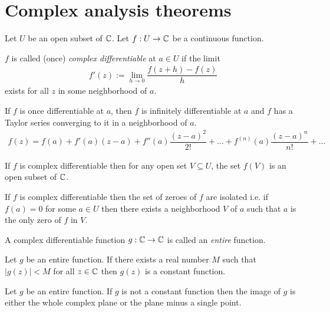 \documentclass{amsart}
\begin{document}
  \section{Complex analysis theorems}
  Let $U$ be an open subset of $\mathbb{C}$.
  Let $f: U \rightarrow \mathbb{C}$ be a continuous function.

  $f$ is called (once) \emph{complex differentiable} at $a \in U$ if the limit
  \begin{align*}
    f'(z) := \lim_{h \rightarrow 0} \dfrac{f(z + h) - f(z)}{h}
  \end{align*}
  exists for all $z$ in some neighborhood of $a$.

  \begin{theorem}
    If $f$ is once differentiable at $a$, then $f$ is infinitely differentiable at $a$ and $f$ has a Taylor series converging to it in a neighborhood of $a$.
    \begin{align*}
      f(z) = f(a) + f'(a){(z-a)} +  f''(a)\dfrac{(z-a)^2}{2!} + \dots +  f^{(n)}(a)\dfrac{(z-a)^n}{n!} + \dots
    \end{align*}
  \end{theorem}

  \begin{theorem}
    If $f$ is complex differentiable then for any open set $V \subseteq U$, the set $f(V)$ is an open subset of $\mathbb{C}$.
  \end{theorem}

  \begin{theorem}
    If $f$ is complex differentiable then the set of zeroes of $f$ are isolated i.e. if $f(a) = 0$ for some $a \in U$ then there exists a neighborhood $V$ of $a$ such that $a$ is the only zero of $f$ in $V$.
  \end{theorem}

\vspace{1cm}

  A complex differentiable function $g: \mathbb{C} \rightarrow \mathbb{C}$ is called an \emph{entire} function.
  \begin{theorem}
    Let $g$ be an entire function.
    If there exists a real number $M$ such that $|g(z)| < M$ for all $z \in \mathbb{C}$ then $g(z)$ is a constant function.
  \end{theorem}

  \begin{theorem}
    Let $g$ be an entire function.
    If $g$ is not a constant function then the image of $g$ is either the whole complex plane or the plane minus a single point.
  \end{theorem}
\end{document}
